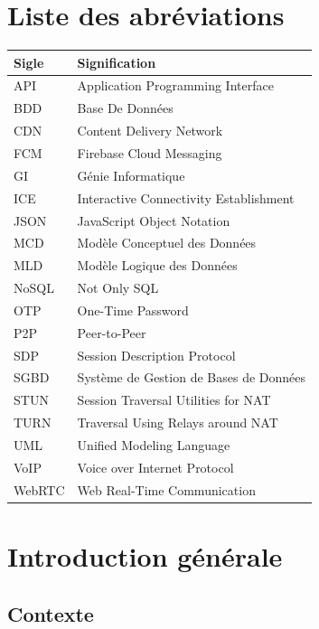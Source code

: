 \documentclass[12pt,a4paper]{report}
\begin{document}
\tableofcontents
\listoffigures
\listoftables

\newpage
\chapter*{Liste des abréviations}

\begin{tabularx}{\textwidth}{@{}lX@{}}
\toprule
\textbf{Sigle} & \textbf{Signification}\\\midrule
API    & Application Programming Interface \\
BDD    & Base De Données \\
CDN    & Content Delivery Network \\
FCM    & Firebase Cloud Messaging \\
GI     & Génie Informatique \\
ICE    & Interactive Connectivity Establishment \\
JSON   & JavaScript Object Notation \\
MCD    & Modèle Conceptuel des Données \\
MLD    & Modèle Logique des Données \\
NoSQL  & Not Only SQL \\
OTP    & One-Time Password \\
P2P    & Peer-to-Peer \\
SDP    & Session Description Protocol \\
SGBD   & Système de Gestion de Bases de Données \\
STUN   & Session Traversal Utilities for NAT \\
TURN   & Traversal Using Relays around NAT \\
UML    & Unified Modeling Language \\
VoIP   & Voice over Internet Protocol \\
WebRTC & Web Real-Time Communication \\
\bottomrule
\end{tabularx}

\chapter{Introduction générale}

\section{Contexte}
\end{document}
